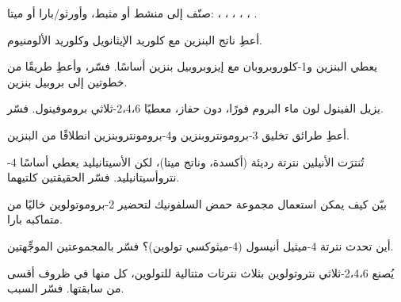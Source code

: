 \begin{exercise}[$\star$]\label{exo:b2:aromatic-substitution:3}
صنّف إلى منشط أو مثبط، وأورثو/بارا أو ميتا: ، ، ،
، ، .
\end{exercise}

\begin{exercise}[$\star$]\label{exo:b2:aromatic-substitution:4}
أعطِ ناتج البنزين مع كلوريد الإيثانويل وكلوريد الألومنيوم.
\end{exercise}

\begin{exercise}[$\star\star$]\label{exo:b2:aromatic-substitution:5}
يعطي البنزين و1-كلوروبروبان مع  إيزوبروبيل بنزين أساسًا. فسّر، وأعطِ
طريقًا من خطوتين إلى بروبيل بنزين.
\end{exercise}

\begin{exercise}[$\star\star$]\label{exo:b2:aromatic-substitution:6}
يزيل الفينول لون ماء البروم فورًا، دون حفاز، معطيًا
2،4،6-ثلاثي بروموفينول. فسّر.
\end{exercise}

\begin{exercise}[$\star\star$]\label{exo:b2:aromatic-substitution:7}
أعطِ طرائق تخليق 3-برومونتروبنزين و4-برومونتروبنزين انطلاقًا من البنزين.
\end{exercise}

\begin{exercise}[$\star\star$]\label{exo:b2:aromatic-substitution:8}
تُنترَت الأنيلين نترتة رديئة (أكسدة، وناتج ميتا)، لكن الأسيتانيليد يعطي أساسًا
4-نتروأسيتانيليد. فسّر الحقيقتين كلتيهما.
\end{exercise}

\begin{exercise}[$\star\star$]\label{exo:b2:aromatic-substitution:9}
بيّن كيف يمكن استعمال مجموعة حمض السلفونيك لتحضير 2-بروموتولوين خاليًا من متماكبه بارا.
\end{exercise}

\begin{exercise}[$\star\star\star$]\label{exo:b2:aromatic-substitution:10}
أين تحدث نترتة 4-ميثيل أنيسول (4-ميثوكسي تولوين)؟ فسّر بالمجموعتين
الموجِّهتين.
\end{exercise}

\begin{exercise}[$\star\star\star$]\label{exo:b2:aromatic-substitution:11}
يُصنع 2،4،6-ثلاثي نتروتولوين بثلاث نترتات متتالية للتولوين، كل منها في ظروف أقسى
من سابقتها. فسّر السبب.
\end{exercise}

